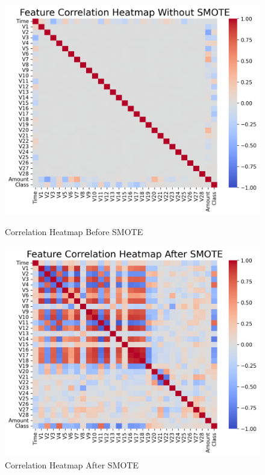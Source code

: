 \documentclass[11pt, oneside]{article}   	%
\begin{document}
\begin{figure}[H]
    \centering
    \begin{minipage}{0.49\textwidth}
        \centering
        \includegraphics[width=1.0\textwidth]{images/correlation_before_smote.png}
        \caption{Correlation Heatmap Before SMOTE}
        \label{fig:correlation_before}
    \end{minipage}\hfill
    \begin{minipage}{0.49\textwidth}
        \centering
        \includegraphics[width=1.0\textwidth]{images/correlation_after_smote.png}
        \caption{Correlation Heatmap After SMOTE}
        \label{fig:correlation_after}
    \end{minipage}
\end{figure}
\end{document}
